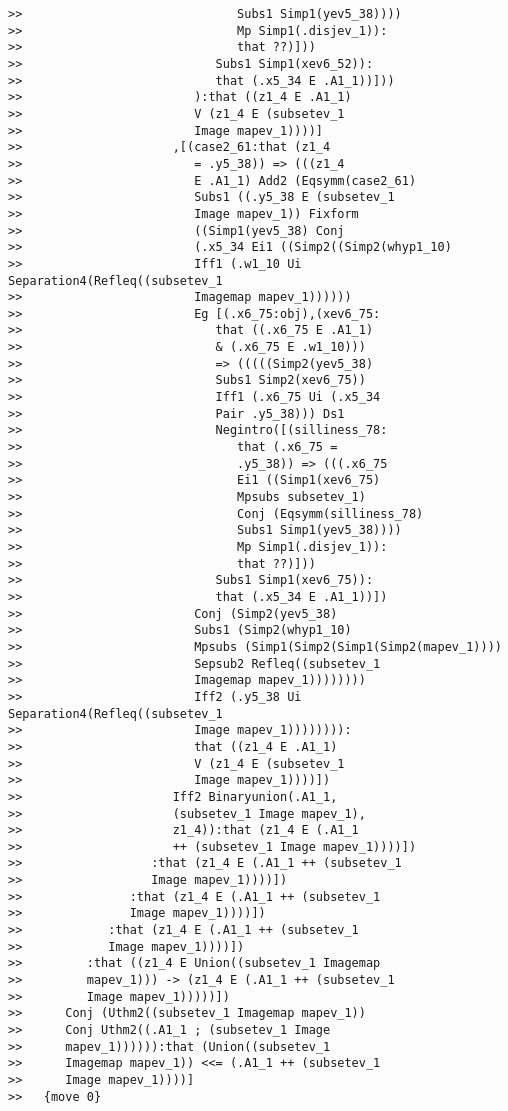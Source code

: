 \documentclass[12pt]{article}
\begin{document}
\begin{verbatim}
>>                              Subs1 Simp1(yev5_38))))
>>                              Mp Simp1(.disjev_1)):
>>                              that ??)]))
>>                           Subs1 Simp1(xev6_52)):
>>                           that (.x5_34 E .A1_1))]))
>>                        ):that ((z1_4 E .A1_1)
>>                        V (z1_4 E (subsetev_1
>>                        Image mapev_1))))]
>>                     ,[(case2_61:that (z1_4
>>                        = .y5_38)) => (((z1_4
>>                        E .A1_1) Add2 (Eqsymm(case2_61)
>>                        Subs1 ((.y5_38 E (subsetev_1
>>                        Image mapev_1)) Fixform
>>                        ((Simp1(yev5_38) Conj
>>                        (.x5_34 Ei1 ((Simp2((Simp2(whyp1_10)
>>                        Iff1 (.w1_10 Ui Separation4(Refleq((subsetev_1
>>                        Imagemap mapev_1))))))
>>                        Eg [(.x6_75:obj),(xev6_75:
>>                           that ((.x6_75 E .A1_1)
>>                           & (.x6_75 E .w1_10)))
>>                           => (((((Simp2(yev5_38)
>>                           Subs1 Simp2(xev6_75))
>>                           Iff1 (.x6_75 Ui (.x5_34
>>                           Pair .y5_38))) Ds1
>>                           Negintro([(silliness_78:
>>                              that (.x6_75 =
>>                              .y5_38)) => (((.x6_75
>>                              Ei1 ((Simp1(xev6_75)
>>                              Mpsubs subsetev_1)
>>                              Conj (Eqsymm(silliness_78)
>>                              Subs1 Simp1(yev5_38))))
>>                              Mp Simp1(.disjev_1)):
>>                              that ??)]))
>>                           Subs1 Simp1(xev6_75)):
>>                           that (.x5_34 E .A1_1))])
>>                        Conj (Simp2(yev5_38)
>>                        Subs1 (Simp2(whyp1_10)
>>                        Mpsubs (Simp1(Simp2(Simp1(Simp2(mapev_1))))
>>                        Sepsub2 Refleq((subsetev_1
>>                        Imagemap mapev_1))))))))
>>                        Iff2 (.y5_38 Ui Separation4(Refleq((subsetev_1
>>                        Image mapev_1)))))))):
>>                        that ((z1_4 E .A1_1)
>>                        V (z1_4 E (subsetev_1
>>                        Image mapev_1))))])
>>                     Iff2 Binaryunion(.A1_1,
>>                     (subsetev_1 Image mapev_1),
>>                     z1_4)):that (z1_4 E (.A1_1
>>                     ++ (subsetev_1 Image mapev_1))))])
>>                  :that (z1_4 E (.A1_1 ++ (subsetev_1
>>                  Image mapev_1))))])
>>               :that (z1_4 E (.A1_1 ++ (subsetev_1
>>               Image mapev_1))))])
>>            :that (z1_4 E (.A1_1 ++ (subsetev_1
>>            Image mapev_1))))])
>>         :that ((z1_4 E Union((subsetev_1 Imagemap
>>         mapev_1))) -> (z1_4 E (.A1_1 ++ (subsetev_1
>>         Image mapev_1)))))])
>>      Conj (Uthm2((subsetev_1 Imagemap mapev_1))
>>      Conj Uthm2((.A1_1 ; (subsetev_1 Image
>>      mapev_1)))))):that (Union((subsetev_1
>>      Imagemap mapev_1)) <<= (.A1_1 ++ (subsetev_1
>>      Image mapev_1))))]
>>   {move 0}




\end{verbatim}
\end{document}

